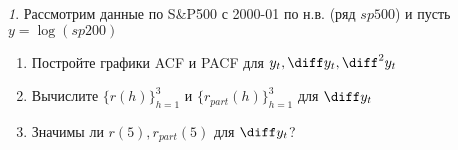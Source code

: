 \documentclass[12pt]{article}
\theoremstyle{remark}
\newtheorem{exercise}{}[subsection]
\begin{document}
\begin{exercise}
Рассмотрим данные по S\&P500 с 2000-01 по н.в. (ряд \(sp500\))
и пусть \(y=\log(sp200)\)
\begin{enumerate}
	\item Постройте графики ACF и PACF для \(y_t, \diff y_t, \diff^2 y_t\)
	\item Вычислите  \(\{r(h)\}_{h=1}^3\) и \(\{r_{part}(h)\}_{h=1}^3\) для \(\diff y_t\)
	\item Значимы ли \(r(5),r_{part}(5)\) для \(\diff y_t\)?
\end{enumerate}
\end{exercise}







\end{document}
